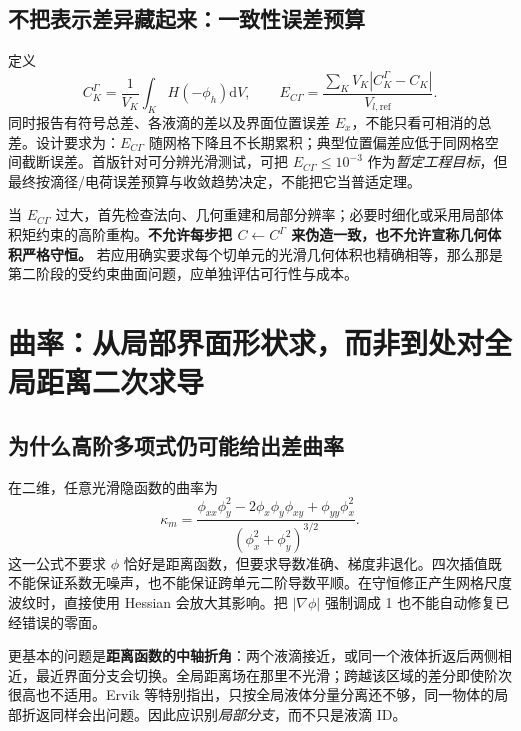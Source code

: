 \documentclass[11pt,a4paper]{article}
\newcommand{\dd}{\mathrm{d}}
\begin{document}
\subsection{不把表示差异藏起来：一致性误差预算}
定义
\begin{equation}
 C_K^\Gamma=\frac1{V_K}\int_K H(-\phi_h)\dd V,\qquad
 E_{C\Gamma}=\frac{\sum_KV_K|C_K^\Gamma-C_K|}{V_{l,\mathrm{ref}}}.
\end{equation}
同时报告有符号总差、各液滴的差以及界面位置误差 $E_x$，不能只看可相消的总差。设计要求为：$E_{C\Gamma}$ 随网格下降且不长期累积；典型位置偏差应低于同网格空间截断误差。首版针对可分辨光滑测试，可把 $E_{C\Gamma}\le10^{-3}$ 作为\emph{暂定工程目标}，但最终按滴径/电荷误差预算与收敛趋势决定，不能把它当普适定理。

当 $E_{C\Gamma}$ 过大，首先检查法向、几何重建和局部分辨率；必要时细化或采用局部体积矩约束的高阶重构。\textbf{不允许每步把 $C\leftarrow C^\Gamma$ 来伪造一致，也不允许宣称几何体积严格守恒。} 若应用确实要求每个切单元的光滑几何体积也精确相等，那么那是第二阶段的受约束曲面问题，应单独评估可行性与成本。

\clearpage
\section{曲率：从局部界面形状求，而非到处对全局距离二次求导}
\subsection{为什么高阶多项式仍可能给出差曲率}
在二维，任意光滑隐函数的曲率为
\begin{equation}
 \kappa_m=\frac{\phi_{xx}\phi_y^2-2\phi_x\phi_y\phi_{xy}+\phi_{yy}\phi_x^2}
 {(\phi_x^2+\phi_y^2)^{3/2}}.
\end{equation}
这一公式不要求 $\phi$ 恰好是距离函数，但要求导数准确、梯度非退化。四次插值既不能保证系数无噪声，也不能保证跨单元二阶导数平顺。在守恒修正产生网格尺度波纹时，直接使用 Hessian 会放大其影响。把 $|\nabla\phi|$ 强制调成 1 也不能自动修复已经错误的零面。

更基本的问题是\textbf{距离函数的中轴折角}：两个液滴接近，或同一个液体折返后两侧相近，最近界面分支会切换。全局距离场在那里不光滑；跨越该区域的差分即使阶次很高也不适用。Ervik 等特别指出，只按全局液体分量分离还不够，同一物体的局部折返同样会出问题\cite{ervik2014}。因此应识别\emph{局部分支}，而不只是液滴 ID。
\end{document}
